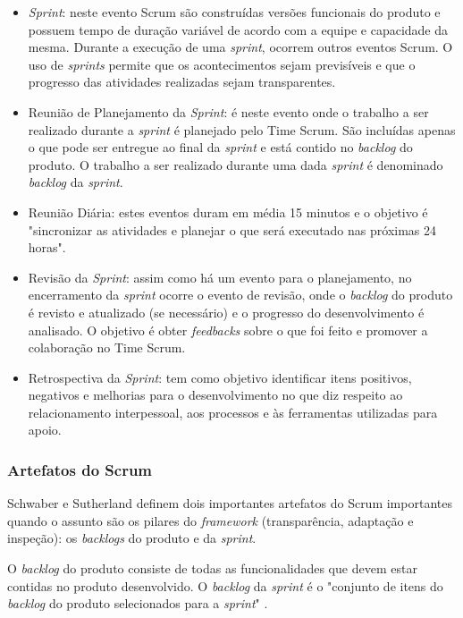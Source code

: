 \begin{itemize}
\item \textit{Sprint}: neste evento Scrum são construídas versões funcionais do produto e possuem tempo de duração variável de acordo com a equipe e capacidade da mesma. Durante a execução de uma \textit{sprint}, ocorrem outros eventos Scrum. O uso de \textit{sprints} permite que os acontecimentos sejam previsíveis e que o progresso das atividades realizadas sejam transparentes.

\item Reunião de Planejamento da \textit{Sprint}: é neste evento onde o trabalho a ser realizado durante a \textit{sprint} é planejado pelo Time Scrum. São incluídas apenas o que pode ser entregue ao final da \textit{sprint} e está contido no \textit{backlog} do produto. O trabalho a ser realizado durante uma dada \textit{sprint} é denominado \textit{backlog} da \textit{sprint}.

\item Reunião Diária: estes eventos duram em média 15 minutos e o objetivo é "sincronizar as atividades e planejar o que será executado nas próximas 24 horas".

\item Revisão da \textit{Sprint}: assim como há um evento para o planejamento, no encerramento da \textit{sprint} ocorre o evento de revisão, onde o \textit{backlog} do produto é revisto e atualizado (se necessário) e o progresso do desenvolvimento é analisado. O objetivo é obter \textit{feedbacks} sobre o que foi feito e promover a colaboração no Time Scrum.

\item Retrospectiva da \textit{Sprint}: tem como objetivo identificar itens positivos, negativos e melhorias para o desenvolvimento no que diz respeito ao relacionamento interpessoal, aos processos e às ferramentas utilizadas para apoio.

\end{itemize}

\subsubsection{Artefatos do Scrum}
Schwaber e Sutherland \cite{schwaber_guia_2013} definem dois importantes artefatos do Scrum importantes quando o assunto são os pilares do \textit{framework} (transparência, adaptação e inspeção): os \textit{backlogs} do produto e da \textit{sprint}. 

O \textit{backlog} do produto consiste de todas as funcionalidades que devem estar contidas no produto desenvolvido. O \textit{backlog} da \textit{sprint} é o "conjunto de itens do \textit{backlog} do produto selecionados para a \textit{sprint}" \cite{schwaber_guia_2013}.


